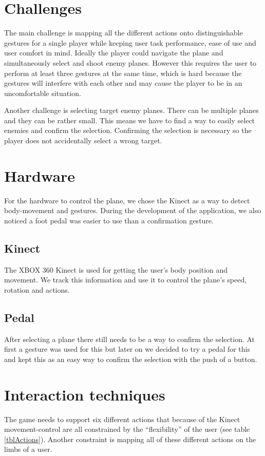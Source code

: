 \documentclass{acm_proc_article-sp}
\begin{document}
\section {Challenges}\label{sec:Challenges}
The main challenge is mapping all the different actions onto distinguishable gestures for a single player while keeping user task performance, ease of use and user comfort in mind. Ideally the player could navigate the plane and simultaneously select and shoot enemy planes. However this requires the user to perform at least three gestures at the same time, which is hard because the gestures will interfere with each other and may cause the player to be in an uncomfortable situation. 

Another challenge is selecting target enemy planes. There can be multiple planes and they can be rather small. This means we have to find a way to easily select enemies and confirm the selection. Confirming the selection is necessary so the player does not accidentally select a wrong target.

\section {Hardware}\label{sec:hardware}
For the hardware to control the plane, we chose the Kinect as a way to detect body-movement and gestures. During the development of the application, we also noticed a foot pedal was easier to use than a confirmation gesture.
\subsection{Kinect}
The XBOX 360 Kinect is used for getting the user's body position and movement. We track this information and use it to control the plane's speed, rotation and actions.

\subsection{Pedal}
After selecting a plane there still needs to be a way to confirm the selection. At first a gesture was used for this but later on we decided to try a pedal for this and kept this as an easy way to confirm the selection with the push of a button.

\section {Interaction techniques}\label{sec:Interactiontechniques}
The game needs to support six different actions that because of the Kinect movement-control are all constrained by the ``flexibility'' of the user (see table \ref{tblActions}). Another constraint is mapping all of these different actions on the limbs of a user.
\end{document}
